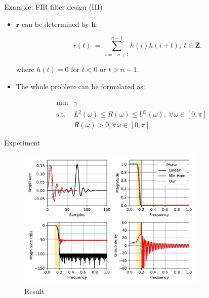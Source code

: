 \documentclass[
  ignorenonframetext,
  aspectratio=169,
  serif,onlymath]{beamer}
\begin{document}
\begin{frame}{Example: FIR filter design (III)}
\protect\hypertarget{example-fir-filter-design-iii}{}

\begin{itemize}
\item
  \(\mathbf{r}\) can be determined by \(\mathbf{h}\):

  \[r(t)~=~\sum_{i=-n+1}^{n-1}{h(i)h(i+t)},~t\in\mathbf{Z}.\]

  where \(h(t)=0\) for \(t < 0\) or \(t > n - 1\).
\item
  The whole problem can be formulated as:
\end{itemize}

\[\begin{array}{ll}
  \text{min}  & \gamma \\
  \text{s.t.} & L^2(\omega) \leq R(\omega) \leq U^2(\omega), \; \forall \omega \in [0,\pi]   \\
              & R(\omega) > 0, \forall \omega \in [0,\pi]
\end{array}\]

\end{frame}

\begin{frame}{Experiment}
\protect\hypertarget{experiment}{}

\begin{figure}
\centering
\includegraphics[width=0.8\textwidth,height=\textheight]{ellipsoid.files/lowpass.pdf}
\caption{Result}
\end{figure}

\end{frame}
\end{document}
